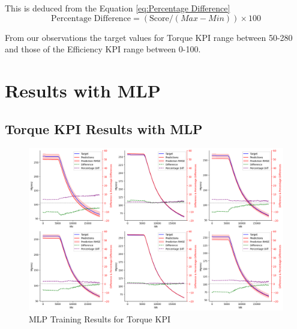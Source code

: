 \documentclass{report} %
\begin{document}
This is deduced from the Equation \ref{eq:Percentage Difference}
\begin{equation}
    \text{Percentage Difference} = (\text{Score} / {(Max - Min)})  \times 100
    \label{eq:Percentage Difference}
\end{equation}

From our observations the target values for Torque \ac{KPI} range between 50-280 and those of the Efficiency \ac{KPI} range between 0-100.

\section{Results with \ac{MLP}}\label{sec:Results with MLP}

\subsection{Torque \ac{KPI} Results with \ac{MLP}}\label{sec:2D Torque Curve Results with MLP}

\begin{figure}[H]
    \centering
    \includegraphics[width=1\textwidth]{./ReportImages/KPI2D_predictions.png} 
    \caption{MLP Training Results for Torque \ac{KPI}} 
    \label{fig:MLP Training Results for 2D KPI(Torque)}
\end{figure}
\end{document}

